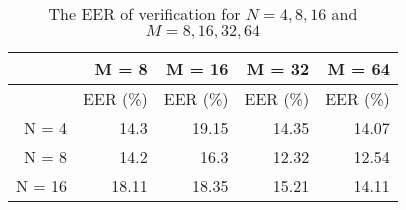 \begin{table}[htbp]
  \centering
  \caption{The EER of verification for $N=4,8,16$ and $M=8,16,32,64$}
    \begin{tabular}{rrrrr}
    \toprule
    \multirow{2}[2]{*}{} & M = 8 & M = 16 & M = 32 & M = 64 \\
    \midrule
          & EER (\%) & EER (\%) & EER (\%) & EER (\%) \\
    N = 4 & 14.3  & 19.15 & 14.35 & 14.07 \\
    N = 8 & 14.2  & 16.3  & 12.32 & 12.54 \\
    N = 16 & 18.11 & 18.35 & 15.21 & 14.11 \\
    \bottomrule
    \end{tabular}%
  \label{tab:experiment:parameters}%
\end{table}%
